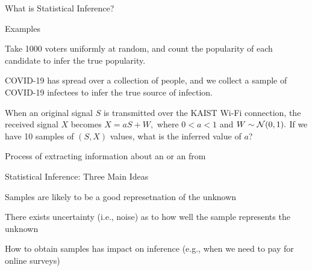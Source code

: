 

\begin{frame}{What is Statistical Inference?}

\plitemsep 0.07in
\bci

\item Examples
  
  \bci

\item<2-> Take 1000 voters uniformly at random, and count the popularity
  of each candidate to infer the true popularity.

\item<3-> COVID-19 has spread over a collection of people, and we collect a sample of COVID-19
  infectees to infer the true source of infection. 

\item<4-> When an original signal $S$ is transmitted over the KAIST Wi-Fi
  connection, the received signal $X$ becomes $X = aS + W,$ where $ 0 <
  a < 1  $ and $W \sim \mathcal N(0,1).$ If we have 10 samples of $(S,X)$
  values, what is the inferred value of $a$?

  \eci

\item<5-> Process of extracting information about an  or
  an  from 


  \eci

\end{frame}

\begin{frame}{Statistical Inference: Three Main Ideas}

\plitemsep 0.2in
\bce

\item<2-> Samples are likely to be a good represetnation of the unknown

\item<3-> There exists uncertainty (i.e., noise) as to how well the sample
  represents the unknown

\item<4-> How to obtain samples has impact on inference (e.g., when we
  need to pay for online surveys)
  
  \ece

\end{frame}

